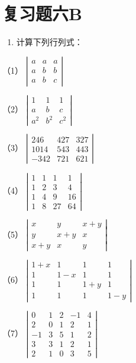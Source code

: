 \section{复习题六B}

\begin{enumerate}
\item
  计算下列行列式：
\end{enumerate}

（1）
\(\left| \begin{array}{ccc}a & a & a\\ a & b & b\\ a & b & c \end{array} \right|\)

（2）
\(\left| \begin{array}{ccc}1 & 1 & 1\\ a & b & c\\ a^2 & b^2 & c^2 \end{array} \right|\)

（3）
\(\left| \begin{array}{ccc}246 & 427 & 327\\ 1014 & 543 & 443\\ -342 & 721 & 621 \end{array} \right|\)

（4）
\(\left| \begin{array}{cccc}1 & 1 & 1 & 1\\ 1 & 2 & 3 & 4\\ 1 & 4 & 9 & 16\\ 1 & 8 & 27 & 64 \end{array} \right|\)

（5）
\(\left| \begin{array}{ccc}x & y & x + y\\ y & x + y & x\\ x + y & x & y \end{array} \right|\)

（6）
\(\left| \begin{array}{cccc}1 + x & 1 & 1 & 1\\ 1 & 1 - x & 1 & 1\\ 1 & 1 & 1 + y & 1\\ 1 & 1 & 1 & 1 - y \end{array} \right|\)

（7）
\(\left| \begin{array}{ccccc}0 & 1 & 2 & -1 & 4\\ 2 & 0 & 1 & 2 & 1\\ -1 & 3 & 5 & 1 & 2\\ 3 & 3 & 1 & 2 & 1\\ 2 & 1 & 0 & 3 & 5 \end{array} \right|\)

